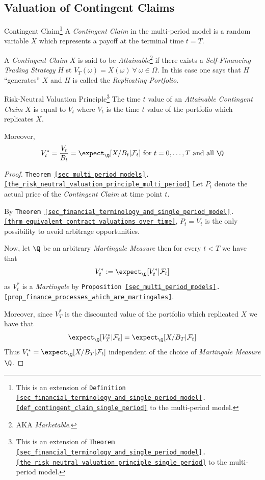 \documentclass[11pt,a4paper]{article}
\begin{document}
\subsection{Valuation of Contingent Claims}

  \begin{definition}{Contingent Claim\footnote{This is an extension of \texttt{Definition \ref{sec_financial_terminology_and_single_period_model}.\ref{def_contingent_claim_single_period}} to the multi-period model.}}
    A \textit{Contingent Claim} in the multi-period model is a random variable $X$ which represents a payoff at the terminal time $t=T$.
    \par A \textit{Contingent Claim} $X$ is said to be \textit{Attainable}\footnote{AKA \textit{Marketable}.} if there exists a \textit{Self-Financing Trading Strategy} $H$ st $V_T(\omega)=X(\omega)\ \forall\ \omega\in\Omega$. In this case one says that $H$ ``generates'' $X$ and $H$ is called the \textit{Replicating Portfolio}.
  \end{definition}

  \begin{theorem}{Risk-Neutral Valuation Principle\footnote{This is an extension of \texttt{Theorem \ref{sec_financial_terminology_and_single_period_model}.\ref{the_risk_neutral_valuation_principle_single_period}} to the multi-period model.}}\label{the_risk_neutral_valuation_principle_multi_period}
    The time $t$ value of an \textit{Attainable Contingent Claim} $X$ is equal to $V_t$ where $V_t$ is the time $t$ value of the portfolio which replicates $X$.
    \par Moreover,
    \[ V_t^*=\frac{V_t}{B_t}=\expect_\Q[X/B_t|\mathcal{F}_t]\text{ for }t=0,\dots,T\text{ and all }\Q \]
  \end{theorem}

  \begin{proof}{\texttt{Theorem \ref{sec_multi_period_models}.\ref{the_risk_neutral_valuation_principle_multi_period}}}
    Let $P_t$ denote the actual price of the \textit{Contingent Claim} at time point $t$.
    \par By \texttt{Theorem \ref{sec_financial_terminology_and_single_period_model}.\ref{thrm_equivalent_contract_valuations_over_time}}, $P_t=V_t$ is the only possibility to avoid arbitrage opportunities.
    \par Now, let $\Q$ be an arbitrary \textit{Martingale Measure} then for every $t<T$ we have that
    \[ V_t^*:=\expect_\Q[V_t^*|\mathcal{F}_t] \]
    as $V_t^*$ is a \textit{Martingale} by \texttt{Proposition \ref{sec_multi_period_models}.\ref{prop_finance_processes_which_are_martingales}}.
    \par Moreover, since $V_T^*$ is the discounted value of the portfolio which replicated $X$ we have that
    \[ \expect_\Q[V_T^*|\mathcal{F}_t]=\expect_\Q[X/B_T|\mathcal{F}_t] \]
    Thus $V_t^*=\expect_\Q[X/B_T|\mathcal{F}_t]$ independent of the choice of \textit{Martingale Measure} $\Q$.
  \end{proof}
\end{document}
